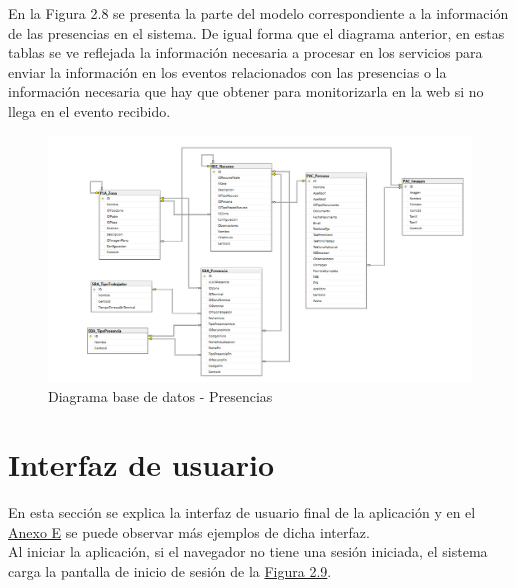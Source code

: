 \newpage
En la Figura 2.8 se presenta la parte del modelo correspondiente a la información de las presencias en el sistema. De igual forma que el diagrama anterior, en estas tablas se ve reflejada la información necesaria a procesar en los servicios para enviar la información en los eventos relacionados con las presencias o la información necesaria que hay que obtener para monitorizarla en la web si no llega en el evento recibido.

\begin{figure}[H]
    \centering
    \includegraphics[width=16cm]{Imagenes/Diagrama-BD-Presencias}
    \caption{Diagrama base de datos - Presencias}
    \label{fig:Diagrama-BD-Presencias}
\end{figure}


\section{Interfaz de usuario}
\label{section-ui}

En esta sección se explica la interfaz de usuario final de la aplicación y en el \hyperref[anexo-e]{Anexo E} se puede observar más ejemplos de dicha interfaz.\\


Al iniciar la aplicación, si el navegador no tiene una sesión iniciada, el sistema carga la pantalla de inicio de sesión de la \hyperref[fig:map]{Figura 2.9}. \\ 

